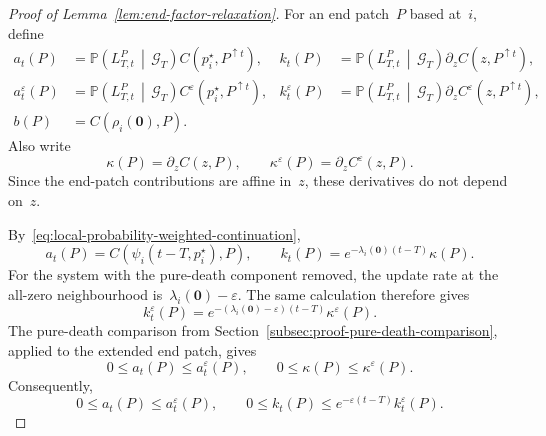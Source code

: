 \documentclass[EJP,preprint,NODS,nobera]{ejpecp}
\newcommand{\pP}{\mathbb{P}}
\newcommand{\CP}[2]{\pP\bb{#1\,\middle|\,#2}}
\newcommand{\bb}[1]{\left(#1\right)}
\newcommand{\mb}[1]{\mathbf{#1}}
\begin{document}
\begin{proof}[Proof of Lemma~\ref{lem:end-factor-relaxation}]
For an end patch~$P$ based at~$i$, define
\begin{align*}
a_t(P)
&=
\CP{L_{T,t}^P}{\mathcal G_T}
C\bb{p_i^\star,P^{\uparrow t}},
&
k_t(P)
&=
\CP{L_{T,t}^P}{\mathcal G_T}
\partial_z C\bb{z,P^{\uparrow t}},
\\
a_t^\varepsilon(P)
&=
\CP{L_{T,t}^P}{\mathcal G_T}
C^\varepsilon\bb{p_i^\star,P^{\uparrow t}},
&
k_t^\varepsilon(P)
&=
\CP{L_{T,t}^P}{\mathcal G_T}
\partial_z C^\varepsilon\bb{z,P^{\uparrow t}},
\\
b(P)
&=
C\bb{\rho_i(\mb 0),P}.
\end{align*}
Also write
\begin{equation*}
\kappa(P)=\partial_zC(z,P),
\qquad
\kappa^\varepsilon(P)=\partial_zC^\varepsilon(z,P).
\end{equation*}
Since the end-patch contributions are affine in~$z$, these derivatives do not
depend on~$z$.

By~\eqref{eq:local-probability-weighted-continuation},
\begin{equation}
\label{eq:continued-end-factor-data}
a_t(P)
=
C\bb{\psi_i(t-T,p_i^\star),P},
\qquad
k_t(P)
=
e^{-\lambda_i(\mb 0)(t-T)}\kappa(P).
\end{equation}
For the system with the pure-death component removed, the update rate at the
all-zero neighbourhood is~$\lambda_i(\mb 0)-\varepsilon$. The same calculation
therefore gives
\begin{equation*}
k_t^\varepsilon(P)
=
e^{-\bb{\lambda_i(\mb 0)-\varepsilon}(t-T)}
\kappa^\varepsilon(P).
\end{equation*}
The pure-death comparison from
Section~\ref{subsec:proof-pure-death-comparison}, applied to the extended end
patch, gives
\begin{equation*}
0\leq a_t(P)\leq a_t^\varepsilon(P),
\qquad
0\leq\kappa(P)\leq\kappa^\varepsilon(P).
\end{equation*}
Consequently,
\begin{equation}
\label{eq:appendix-continued-factor-comparisons}
0\leq a_t(P)\leq a_t^\varepsilon(P),
\qquad
0\leq k_t(P)\leq e^{-\varepsilon(t-T)}k_t^\varepsilon(P).
\end{equation}


\end{proof}
\end{document}
